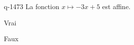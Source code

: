 \begin{truefalse}{q-1473}
La fonction $x\mapsto -3x+5$ est affine.
\item* Vrai
\item Faux
\end{truefalse}

